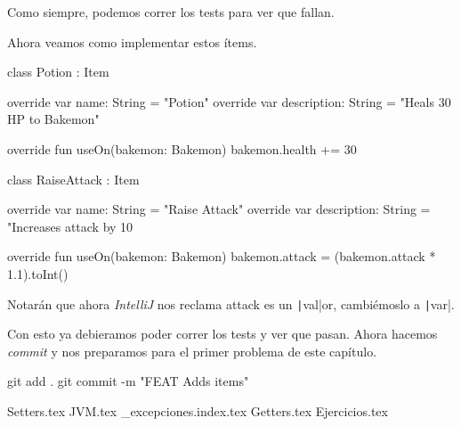   Como siempre, podemos correr los tests para ver que fallan.

  Ahora veamos como implementar estos ítems.

  \begin{kotlin}
    class Potion : Item {
      override var name: String = "Potion"
      override var description: String = "Heals 30 HP to Bakemon"

      override fun useOn(bakemon: Bakemon) {
        bakemon.health += 30
      }
    }
  \end{kotlin}

  \begin{kotlin}
    class RaiseAttack : Item {
      override var name: String = "Raise Attack"
      override var description: String = "Increases attack by 10%

      override fun useOn(bakemon: Bakemon) {
        bakemon.attack = (bakemon.attack * 1.1).toInt()
      }
    }
  \end{kotlin}

  Notarán que ahora \textit{IntelliJ} nos reclama attack es un \texttt|val|or, 
  cambiémoslo a \texttt|var|.

  Con esto ya debieramos poder correr los tests y ver que pasan.
  Ahora hacemos \textit{commit} y nos preparamos para el primer problema de este capítulo.

  \begin{powershell}
    git add .
    git commit -m "FEAT Adds items"
  \end{powershell}

  {Setters.tex}
  {JVM.tex}
  {_excepciones.index.tex}
  {Getters.tex}
  {Ejercicios.tex}
  
  \printbibliography[keyword=exceptions]